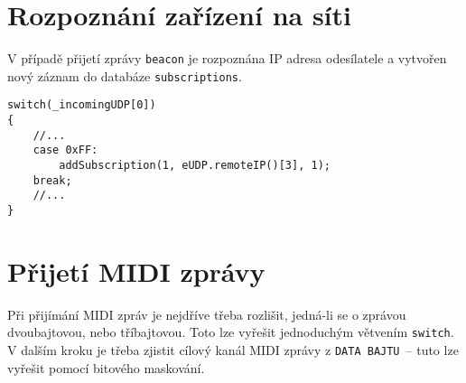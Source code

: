 \section{Rozpoznání zařízení na síti}
V případě přijetí zprávy \texttt{beacon} je rozpoznána IP adresa odesílatele a vytvořen nový záznam do databáze \texttt{sub\-scrip\-tions}. 

\begin{lstlisting}
switch(_incomingUDP[0])
{
    //...
    case 0xFF:
        addSubscription(1, eUDP.remoteIP()[3], 1);
    break;
    //...
}
\end{lstlisting}

\section{Přijetí \acs{MIDI} zprávy}
Při přijímání \acs{MIDI} zpráv je nejdříve třeba rozlišit, jedná-li se o zprávou dvoubajtovou, nebo tříbajtovou. Toto lze vyřešit jednoduchým větvením \texttt{switch}. V dalším kroku je třeba zjistit cílový kanál \acs{MIDI} zprávy z \texttt{DATA BAJTU}~-- tuto  lze vyřešit pomocí bitového maskování.


